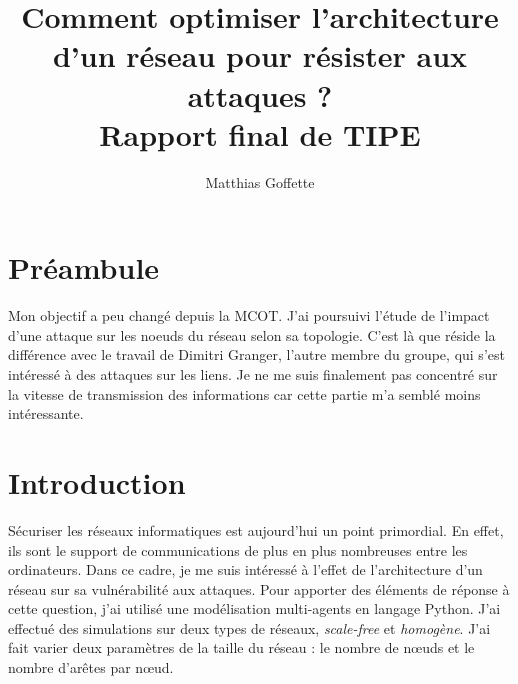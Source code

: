 \documentclass[12pt,a4paper]{article}
\title{Comment optimiser l'architecture d'un réseau pour résister aux attaques ?\\ \bigskip
  Rapport final de TIPE}
\author{Matthias Goffette}
\date{}
\begin{document}
\maketitle





\section{Préambule} %

Mon objectif a peu changé depuis la MCOT.
J'ai poursuivi l'étude de l'impact d'une attaque sur les noeuds du réseau selon sa topologie.
C'est là que réside la différence avec le travail de Dimitri Granger, l'autre membre du groupe, qui s'est intéressé à des attaques sur les liens.
Je ne me suis finalement pas concentré sur la vitesse de transmission des informations car cette partie m'a semblé moins intéressante.


\section{Introduction} %


Sécuriser les réseaux informatiques est aujourd'hui un point primordial.
En effet, ils sont le support de communications de plus en plus nombreuses entre les ordinateurs.
Dans ce cadre, je me suis intéressé à l'effet de l'architecture d'un réseau sur sa vulnérabilité aux attaques.
Pour apporter des éléments de réponse à cette question, j'ai utilisé une modélisation multi-agents en langage Python.
J'ai effectué des simulations sur deux types de réseaux, \emph{scale-free} et \emph{homogène}.
J'ai fait varier deux paramètres de la taille du réseau : le nombre de nœuds et le nombre d'arêtes par nœud.  
\end{document}
